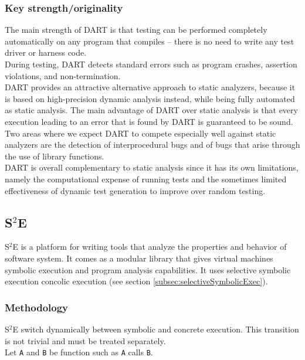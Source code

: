 \documentclass[11pt]{article}
\begin{document}
	    \subsubsection{Key strength/originality}
	    	The main strength of DART is that testing can be performed completely automatically on any program that compiles – there is no need to write any test driver or harness code.\\
	    	During testing, DART detects standard errors such as program crashes, assertion violations, and non-termination.\\
	    	DART provides an attractive alternative approach to static analyzers, because it is based on high-precision dynamic analysis instead, while being fully automated as static analysis. The main advantage of DART over static analysis is that every execution leading to an error that is found by DART is guaranteed to be sound. Two areas where we expect DART to compete especially well against static analyzers are the detection of interprocedural bugs and of bugs that arise through the use of library functions.\\

	    	DART is overall complementary to static analysis since it has its own limitations, namely the computational expense of running tests and the sometimes limited effectiveness of dynamic test generation to improve over random testing.
	    	
	\subsection{S$^2$E}
    \label{subsec:S2E}
    	S$^2$E is a platform for writing tools that analyze the properties and behavior of software system. It comes as a modular library that gives virtual machines symbolic execution and program analysis capabilities.\cite{S2EWebSite} It uses selective symbolic execution concolic execution (see section  \ref{subsec:selectiveSymbolicExec}).
    	
    	    	
    	
    	\subsubsection{Methodology}
    		S$^2$E switch dynamically between symbolic and concrete execution. This transition is not trivial and must be treated separately.\\
    		Let \texttt{A} and \texttt{B} be function such as \texttt{A} calls \texttt{B}.\\
\end{document}
